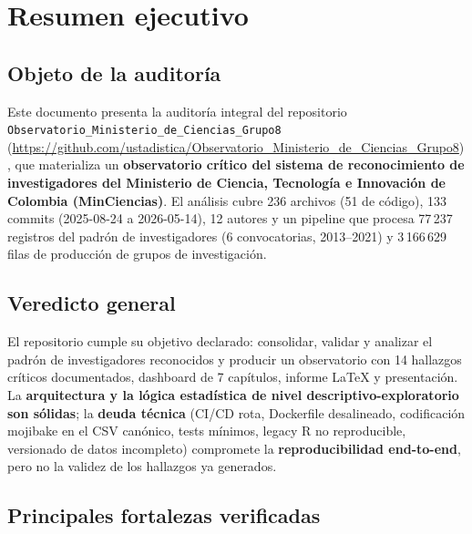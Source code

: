 
\section{Resumen ejecutivo}

\subsection{Objeto de la auditoría}

Este documento presenta la auditoría integral del repositorio
\texttt{Observatorio\_Ministerio\_de\_Ciencias\_Grupo8}
(\url{https://github.com/ustadistica/Observatorio_Ministerio_de_Ciencias_Grupo8}),
que materializa un \textbf{observatorio crítico del sistema de reconocimiento de
investigadores del Ministerio de Ciencia, Tecnología e Innovación de Colombia
(MinCiencias)}. El análisis cubre 236 archivos (51 de código), 133 commits
(2025-08-24 a 2026-05-14), 12 autores y un pipeline que procesa 77\,237 registros
del padrón de investigadores (6 convocatorias, 2013--2021) y 3\,166\,629 filas de
producción de grupos de investigación.

\subsection{Veredicto general}

\begin{tcolorbox}[hallazgo]
El repositorio cumple su objetivo declarado: consolidar, validar y analizar el
padrón de investigadores reconocidos y producir un observatorio con 14 hallazgos
críticos documentados, dashboard de 7 capítulos, informe LaTeX y presentación.
La \textbf{arquitectura y la lógica estadística de nivel descriptivo-exploratorio
son sólidas}; la \textbf{deuda técnica} (CI/CD rota, Dockerfile desalineado,
codificación mojibake en el CSV canónico, tests mínimos, legacy R no reproducible,
versionado de datos incompleto) compromete la \textbf{reproducibilidad end-to-end},
pero no la validez de los hallazgos ya generados.
\end{tcolorbox}

\subsection{Principales fortalezas verificadas}

